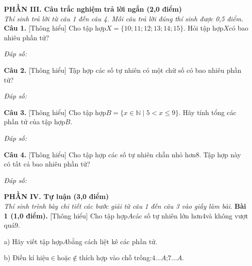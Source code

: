 \documentclass[11pt,a4paper]{article}
\begin{document}
\vspace{6pt}
\noindent
\textbf{\large PHẦN III. Câu trắc nghiệm trả lời ngắn (2,0 điểm)}\\
\textit{\small Thí sinh trả lời từ câu 1 đến câu 4. Mỗi câu trả lời đúng thí sinh được 0,5 điểm.}
\vspace{6pt}
\noindent\textbf{Câu 1.} [Thông hiểu] Cho tập hợp$X = \{10; 11; 12; 13; 14; 15\}$. Hỏi tập hợp$X$có bao nhiêu phần tử?\par\vspace{2pt}
\noindent\textit{Đáp số:} \dotfill\par\vspace{6pt}

\noindent\textbf{Câu 2.} [Thông hiểu] Tập hợp các số tự nhiên có một chữ số có bao nhiêu phần tử?\par\vspace{2pt}
\noindent\textit{Đáp số:} \dotfill\par\vspace{6pt}

\noindent\textbf{Câu 3.} [Thông hiểu] Cho tập hợp$B = \{x \in \mathbb{N} \mid 5 < x \le 9\}$. Hãy tính tổng các phần tử của tập hợp$B$.\par\vspace{2pt}
\noindent\textit{Đáp số:} \dotfill\par\vspace{6pt}

\noindent\textbf{Câu 4.} [Thông hiểu] Cho tập hợp các số tự nhiên chẵn nhỏ hơn$8$. Tập hợp này có tất cả bao nhiêu phần tử?\par\vspace{2pt}
\noindent\textit{Đáp số:} \dotfill\par\vspace{6pt}


\vspace{6pt}
\noindent
\textbf{\large PHẦN IV. Tự luận (3,0 điểm)}\\
\textit{\small Thí sinh trình bày chi tiết các bước giải từ câu 1 đến câu 3 vào giấy làm bài.}
\vspace{6pt}
\noindent\textbf{Bài 1 (1,0 điểm).} [Thông hiểu] Cho tập hợp$A$các số tự nhiên lớn hơn$4$và không vượt quá$9$.\par\noindent a) Hãy viết tập hợp$A$bằng cách liệt kê các phần tử.\par\noindent b) Điền kí hiệu$\in$hoặc$\notin$thích hợp vào chỗ trống:$4 \dots A$;$7 \dots A$.\par\vspace{8pt}
\end{document}
